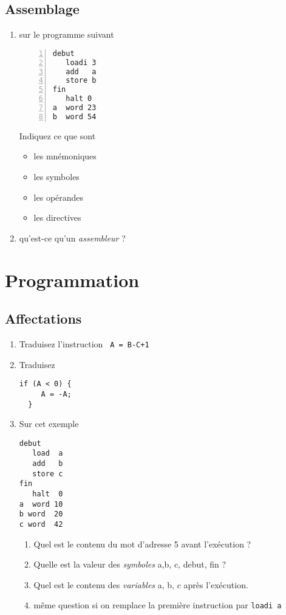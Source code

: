 \documentclass[10pt]{article}
\begin{document}
\begin{multicols*}{2}
\subsection{Assemblage}

\begin{enumerate}
\item sur le programme suivant

\begin{lstlisting}[frame=single, numbers=left]
debut
   loadi 3
   add   a
   store b
fin
   halt 0
a  word 23
b  word 54
\end{lstlisting}
Indiquez ce que sont 
\begin{itemize}
\item les mnémoniques
\item les symboles
\item les opérandes
\item les directives
\end{itemize}

\item qu'est-ce qu'un \emph{assembleur} ?
\end{enumerate}

\section{Programmation}

\subsection{Affectations}

\begin{enumerate}
\item Traduisez l'instruction \texttt{ A = B-C+1 }
\item Traduisez 
\begin{lstlisting}[frame=single]
  if (A < 0) {
     A = -A;
  }
\end{lstlisting}
\item Sur cet exemple
\begin{lstlisting}[frame=single]
debut
   load  a
   add   b
   store c
fin
   halt  0
a  word 10
b word  20
c word  42
\end{lstlisting}

\begin{enumerate}
  \item Quel est le contenu du mot d'adresse 5 avant l'exécution ?
\item
   Quelle est la valeur des \emph{symboles} a,b, c, debut, fin ?
\item 
   Quel est le contenu des \emph{variables} a, b, c après l'exécution.
\item même question si on remplace la première instruction par \texttt{loadi a}
\end{enumerate}


\end{enumerate}
\end{multicols*}
\end{document}
